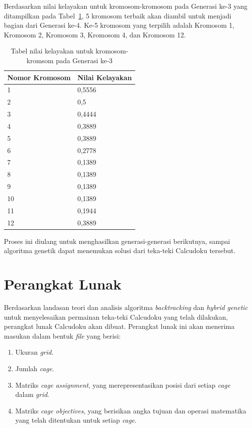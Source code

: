 \clearpage

Berdasarkan nilai kelayakan untuk kromosom-kromosom pada Generasi ke-3 yang ditampilkan pada Tabel~\ref{tab:analisishg4}, 5 kromosom terbaik akan diambil untuk menjadi bagian dari Generasi ke-4. Ke-5 kromosom yang terpilih adalah Kromosom 1, Kromosom 2, Kromosom 3, Kromosom 4, dan Kromosom 12.

\begin{table}
\centering
\captionsetup{justification=centering}
\begin{tabular}{| l | l |}
\hline
Nomor Kromosom & Nilai Kelayakan \\
\hline \hline
1 & 0,5556 \\
\hline
2 & 0,5 \\
\hline
3 & 0,4444 \\
\hline
4 & 0,3889 \\
\hline
5 & 0,3889 \\
\hline
6 & 0,2778 \\
\hline
7 & 0,1389 \\
\hline
8 & 0,1389 \\
\hline
9 & 0,1389 \\
\hline
10 & 0,1389 \\
\hline
11 & 0,1944 \\
\hline
12 & 0,3889 \\
\hline
\end{tabular}
\caption[Tabel nilai kelayakan untuk kromosom-kromsom pada Generasi ke-3]{Tabel nilai kelayakan untuk kromosom-kromsom pada Generasi ke-3}
\label{tab:analisishg4}
\end{table}

Proses ini diulang untuk menghasilkan generasi-generasi berikutnya, sampai algoritma genetik dapat menemukan solusi dari teka-teki Calcudoku tersebut.

\section{Perangkat Lunak}
\label{sec:analisispl}

Berdasarkan landasan teori dan analisis algoritma \textit{backtracking} dan \textit{hybrid genetic} untuk menyelesaikan permainan teka-teki Calcudoku yang telah dilakukan, perangkat lunak Calcudoku akan dibuat. Perangkat lunak ini akan menerima masukan dalam bentuk \textit{file} yang berisi:

\begin{enumerate}
\item Ukuran \textit{grid}.
\item Jumlah \textit{cage}.
\item Matriks \textit{cage assignment}, yang merepresentasikan posisi dari setiap \textit{cage} dalam \textit{grid}.
\item Matriks \textit{cage objectives}, yang berisikan angka tujuan dan operasi matematika yang telah ditentukan untuk setiap \textit{cage}.
\end{enumerate}

